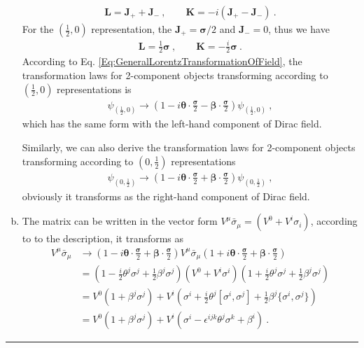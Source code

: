 \documentclass[12pt]{report}
\numberwithin{problemname}{chapter}
\newenvironment{solution}{\vspace{1em}\par\noindent{\large\textbf{\textsc{Solution}}}\par}{\vspace{1em}\hrule}
\begin{document}
\begin{solution}
\begin{enumerate}[(a)]
    \begin{align}
        \mathbf{L}=\mathbf{J}_+ + \mathbf{J}_-\ ,\quad\quad \mathbf{K}=-i(\mathbf{J}_+ - \mathbf{J}_-)\ .
    \end{align}
    For the $(\frac{1}{2},0)$ representation, the $\mathbf{J}_+=\bm{\sigma}/2$ and $\mathbf{J}_-=0$, thus we have
    \begin{align}
        \mathbf{L}=\frac{1}{2}\bm{\sigma}\ ,\quad\quad \mathbf{K}=-\frac{i}{2}\bm{\sigma}\ .
    \end{align}
    According to Eq. \eqref{Eq:GeneralLorentzTransformationOfField}, the transformation laws for 2-component objects transforming according to $(\frac{1}{2},0)$ representations is
    \begin{align}
        \psi_{(\frac{1}{2},0)}\rightarrow(1-i\bm{\theta}\cdot\frac{\bm{\sigma}}{2}-\bm{\beta}\cdot\frac{\bm{\sigma}}{2})\psi_{(\frac{1}{2},0)}\ ,
    \end{align}
    which has the same form with the left-hand component of Dirac field.\par
    Similarly, we can also derive the transformation laws for 2-component objects transforming according to $(0,\frac{1}{2})$ representations
    \begin{align}
        \psi_{(0,\frac{1}{2})}\rightarrow(1-i\bm{\theta}\cdot\frac{\bm{\sigma}}{2}+\bm{\beta}\cdot\frac{\bm{\sigma}}{2})\psi_{(0,\frac{1}{2})}\ ,
    \end{align}
    obviously it transforms as the right-hand component of Dirac field.
    \item The matrix can be written in the vector form $V^{\mu}\bar{\sigma}_{\mu}=(V^0+V^i\sigma_i)$, according to to the description, it transforms as
    \begin{align}
        V^{\mu}\bar{\sigma}_{\mu}&\rightarrow(1-i\bm{\theta}\cdot\frac{\bm{\sigma}}{2}+\bm{\beta}\cdot\frac{\bm{\sigma}}{2})V^{\mu}\bar{\sigma}_{\mu}(1+i\bm{\theta}\cdot\frac{\bm{\sigma}}{2}+\bm{\beta}\cdot\frac{\bm{\sigma}}{2}) \nonumber \\
        &=(1-\frac{i}{2}\theta^j\sigma^j+\frac{1}{2}\beta^j\sigma^j)(V^0+V^i\sigma^i)(1+\frac{i}{2}\theta^j\sigma^j+\frac{1}{2}\beta^j\sigma^j) \nonumber \\
        &=V^0(1+\beta^j\sigma^j)+V^i(\sigma^i+\frac{i}{2}\theta^j[\sigma^i,\sigma^j]+\frac{1}{2}\beta^j\{\sigma^i,\sigma^j\}) \nonumber \\
        &=V^0(1+\beta^j\sigma^j)+V^i(\sigma^i-\epsilon^{ijk}\theta^j\sigma^k+\beta^i)\ . \label{Eq:1/2 1/2RepresentationTrans}

\end{align}
\end{enumerate}
\end{solution}
\end{document}
